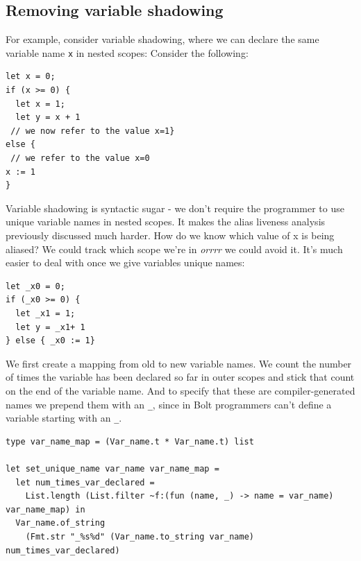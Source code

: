 \hypertarget{removing-variable-shadowing}{%
\subsection{\texorpdfstring{\protect\hyperlink{removing-variable-shadowing}{}Removing
variable
shadowing}{Removing variable shadowing}}\label{removing-variable-shadowing}}

For example, consider variable shadowing, where we can declare the same
variable name \texttt{x} in nested scopes: Consider the following:

%

\begin{verbatim}
let x = 0;
if (x >= 0) {
  let x = 1;
  let y = x + 1
 // we now refer to the value x=1}
else {
 // we refer to the value x=0 
x := 1
}
\end{verbatim}

Variable shadowing is syntactic sugar - we don't require the programmer
to use unique variable names in nested scopes. It makes the
{alias
liveness analysis previously discussed} much harder. How do we know
which value of x is being aliased? We could track which scope we're in
\emph{orrrr} we could avoid it. It's much easier to deal with once we
give variables unique names:

%

\begin{verbatim}
let _x0 = 0;
if (_x0 >= 0) {
  let _x1 = 1;
  let y = _x1+ 1
} else { _x0 := 1}
\end{verbatim}

We first create a mapping from old to new variable names. We count the
number of times the variable has been declared so far in outer scopes
and stick that count on the end of the variable name. And to specify
that these are compiler-generated names we prepend them with an
\texttt{\_}, since in Bolt programmers can't define a variable starting
with an \texttt{\_}.

\begin{lstlisting}[language=caml,caption={{remove\_variable\_shadowing.ml}}]
type var_name_map = (Var_name.t * Var_name.t) list

let set_unique_name var_name var_name_map =
  let num_times_var_declared =
    List.length (List.filter ~f:(fun (name, _) -> name = var_name) var_name_map) in
  Var_name.of_string
    (Fmt.str "_%s%d" (Var_name.to_string var_name) num_times_var_declared)
\end{lstlisting}


